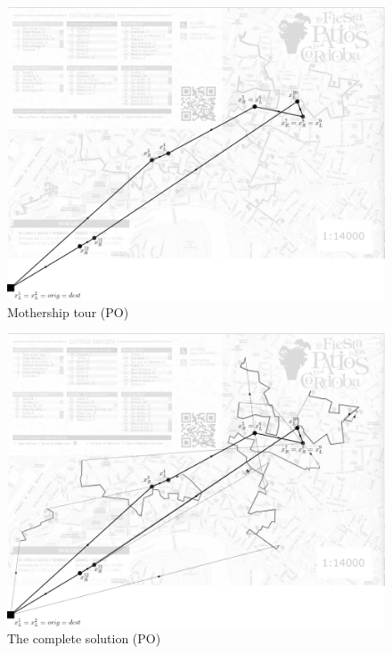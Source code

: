 \documentclass[10pt,a4paper]{elsarticle}
\begin{document}
\begin{figure}[h!]
	\centering
	\includegraphics[width=0.6\linewidth]{asynchronous_1_gray.png}
	\caption{Mothership tour (PO) \label{fig:Mtour_PO}}
\end{figure}
\begin{figure}[h!]
	\centering
	\includegraphics[width=0.6\linewidth]{asynchronous_2_gray.png}
	\caption{The complete solution (PO) \label{fig:tourD_PO}}
\end{figure}
\end{document}
